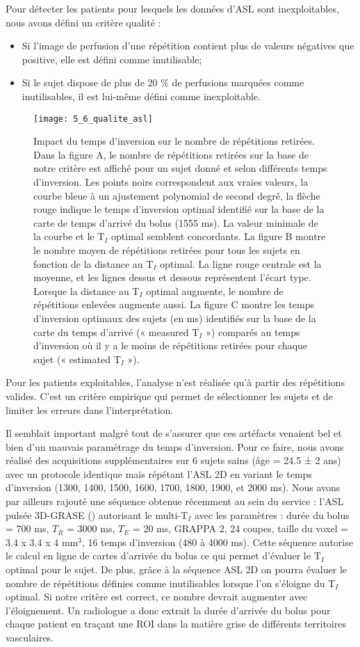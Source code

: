 Pour détecter les patients pour lesquels les données d’ASL sont inexploitables, nous avons défini
un critère qualité :
\begin{itemize}
\item Si l’image de perfusion d’une répétition contient plus de valeurs négatives que positive, elle
est défini comme inutilisable;
\item Si le sujet dispose de plus de 20 \% de perfusions marquées comme inutilisables, il est lui-même
défini comme inexploitable.
\end{itemize}
\begin{figure}[!t]
\centering
\texttt{[image: 5\_6\_qualite\_asl]}
\caption{Impact du temps d'inversion sur le nombre de répétitions retirées. Dans la figure A, le nombre de répétitions
retirées sur la base de notre critère est affiché pour un sujet donné et selon différents temps d’inversion. Les points noirs
correspondent aux vraies valeurs, la courbe bleue à un ajustement polynomial de second degré, la flèche rouge indique le
temps d’inversion optimal identifié sur la base de la carte de temps d’arrivé du bolus (1555 ms). La valeur minimale de la
courbe et le T$_I$ optimal semblent concordants. La figure B montre le nombre moyen de répétitions retirées pour tous les
sujets en fonction de la distance au T$_I$ optimal. La ligne rouge centrale est la moyenne, et les lignes dessus et dessous
représentent l’écart type. Lorsque la distance au T$_I$ optimal augmente, le nombre de répétitions enlevées augmente aussi. La
figure C montre les temps d’inversion optimaux des sujets (en ms) identifiés sur la base de la carte du temps d’arrivé
(« measured T$_I$ ») comparés au temps d’inversion où il y a le moins de répétitions retirées pour chaque sujet (« estimated
T$_I$ »).}
\label{fig:5_6_qualite_asl}	
\end{figure}
Pour les patients exploitables, l’analyse n’est réalisée qu’à partir des répétitions valides. C’est un
critère empirique qui permet de sélectionner les sujets et de limiter les erreurs dans l’interprétation.

Il semblait important malgré tout de s’assurer que ces artéfacts venaient bel et bien d’un mauvais
paramétrage du temps d’inversion. Pour ce faire, nous avons réalisé des acquisitions supplémentaires
sur 6 sujets sains (âge = 24.5 ± 2 ans) avec un protocole identique mais répétant l’ASL 2D en variant le
temps d’inversion (1300, 1400, 1500, 1600, 1700, 1800, 1900, et 2000 ms). Nous avons par ailleurs
rajouté une séquence obtenue récemment au sein du service : l’ASL pulsée 3D-GRASE (\cite{Gunther2005}) autorisant
le multi-T$_I$ avec les paramètres : durée du bolus = 700 ms, $T_R$ = 3000 ms, $T_E$ = 20 ms, GRAPPA 2, 24
coupes, taille du voxel = 3.4 x 3.4 x 4 mm$^3$, 16 temps d’inversion (480 à 4000 ms). Cette séquence
autorise le calcul en ligne de cartes d’arrivée du bolus ce qui permet d’évaluer le T$_I$ optimal pour le
sujet. De plus, grâce à la séquence ASL 2D on pourra évaluer le nombre de répétitions définies comme
inutilisables lorsque l’on s’éloigne du T$_I$ optimal. Si notre critère est correct, ce nombre devrait
augmenter avec l’éloignement. Un radiologue a donc extrait la durée d’arrivée du bolus pour chaque
patient en traçant une ROI dans la matière grise de différents territoires vasculaires.

